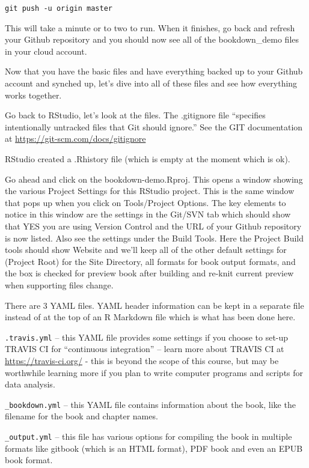 \documentclass[]{book}
\theoremstyle{definition}
\theoremstyle{definition}
\theoremstyle{definition}
\theoremstyle{remark}
\begin{document}
\texttt{git\ push\ -u\ origin\ master}

This will take a minute or to two to run. When it finishes, go back and
refresh your Github repository and you should now see all of the
bookdown\_demo files in your cloud account.

Now that you have the basic files and have everything backed up to your
Github account and synched up, let's dive into all of these files and
see how everything works together.

Go back to RStudio, let's look at the files. The .gitignore file
``specifies intentionally untracked files that Git should ignore.'' See
the GIT documentation at \url{https://git-scm.com/docs/gitignore}

RStudio created a .Rhistory file (which is empty at the moment which is
ok).

Go ahead and click on the bookdown-demo.Rproj. This opens a window
showing the various Project Settings for this RStudio project. This is
the same window that pops up when you click on Tools/Project Options.
The key elements to notice in this window are the settings in the
Git/SVN tab which should show that YES you are using Version Control and
the URL of your Github repository is now listed. Also see the settings
under the Build Tools. Here the Project Build tools should show Website
and we'll keep all of the other default settings for (Project Root) for
the Site Directory, all formats for book output formats, and the box is
checked for preview book after building and re-knit current preview when
supporting files change.

There are 3 YAML files. YAML header information can be kept in a
separate file instead of at the top of an R Markdown file which is what
has been done here.

\texttt{.travis.yml} -- this YAML file provides some settings if you
choose to set-up TRAVIS CI for ``continuous integration'' -- learn more
about TRAVIS CI at \url{https://travis-ci.org/} - this is beyond the
scope of this course, but may be worthwhile learning more if you plan to
write computer programs and scripts for data analysis.

\texttt{\_bookdown.yml} -- this YAML file contains information about the
book, like the filename for the book and chapter names.

\texttt{\_output.yml} -- this file has various options for compiling the
book in multiple formats like gitbook (which is an HTML format), PDF
book and even an EPUB book format.
\end{document}
